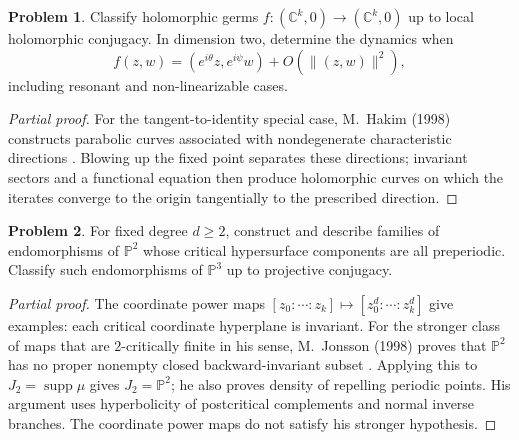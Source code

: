 \documentclass[11pt,reqno]{amsart}
\theoremstyle{definition}
\newtheorem{problem}{Problem}[section]
\theoremstyle{remark}
\begin{document}
\begin{problem}\label{b95-10-3-5}\label{FS-2.26}
Classify holomorphic germs $f:(\mathbb C^k,0)\to(\mathbb C^k,0)$ up to local holomorphic conjugacy. In dimension two, determine the dynamics when
\[
 f(z,w)=(e^{i\theta}z,e^{i\psi}w)+O(\|(z,w)\|^2),
\]
including resonant and non-linearizable cases.
\end{problem}
\begin{proof}[Partial proof]
For the tangent-to-identity special case, M.~Hakim (1998) constructs parabolic curves associated with nondegenerate characteristic directions \cite{FS-Hakim}. Blowing up the fixed point separates these directions; invariant sectors and a functional equation then produce holomorphic curves on which the iterates converge to the origin tangentially to the prescribed direction.
\end{proof}

\begin{problem}\label{b95-10-3-9}\label{FS-2.20}
For fixed degree $d\geq2$, construct and describe families of endomorphisms of $\mathbb P^2$ whose critical hypersurface components are all preperiodic. Classify such endomorphisms of $\mathbb P^3$ up to projective conjugacy.
\end{problem}
\begin{proof}[Partial proof]
The coordinate power maps $[z_0:\cdots:z_k]\mapsto[z_0^d:\cdots:z_k^d]$ give examples: each critical coordinate hyperplane is invariant. For the stronger class of maps that are $2$-critically finite in his sense, M.~Jonsson (1998) proves that $\mathbb P^2$ has no proper nonempty closed backward-invariant subset \cite{FS-PCF}. Applying this to $J_2=\operatorname{supp}\mu$ gives $J_2=\mathbb P^2$; he also proves density of repelling periodic points. His argument uses hyperbolicity of postcritical complements and normal inverse branches. The coordinate power maps do not satisfy his stronger hypothesis.
\end{proof}
\end{document}
